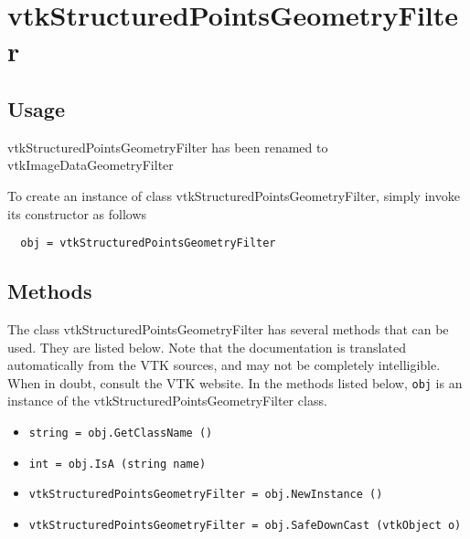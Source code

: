 \section{vtkStructuredPointsGeometryFilter}

\subsection{Usage}

 vtkStructuredPointsGeometryFilter has been renamed to
 vtkImageDataGeometryFilter

To create an instance of class vtkStructuredPointsGeometryFilter, simply
invoke its constructor as follows
\begin{verbatim}
  obj = vtkStructuredPointsGeometryFilter
\end{verbatim}
\subsection{Methods}

The class vtkStructuredPointsGeometryFilter has several methods that can be used.
  They are listed below.
Note that the documentation is translated automatically from the VTK sources,
and may not be completely intelligible.  When in doubt, consult the VTK website.
In the methods listed below, \verb|obj| is an instance of the vtkStructuredPointsGeometryFilter class.
\begin{itemize}
\item  \verb|string = obj.GetClassName ()|

\item  \verb|int = obj.IsA (string name)|

\item  \verb|vtkStructuredPointsGeometryFilter = obj.NewInstance ()|

\item  \verb|vtkStructuredPointsGeometryFilter = obj.SafeDownCast (vtkObject o)|

\end{itemize}
